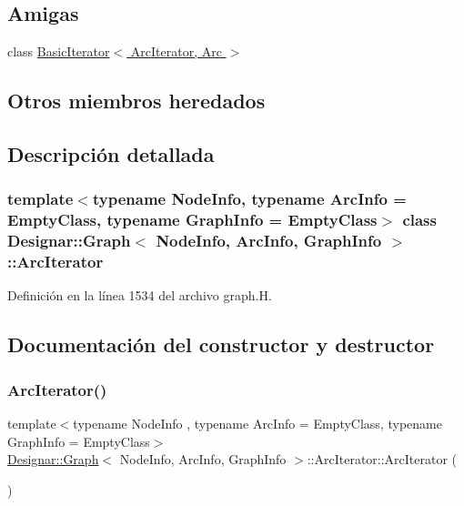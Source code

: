 \subsection*{Amigas}
\begin{DoxyCompactItemize}
\item 
class \hyperlink{class_designar_1_1_graph_1_1_arc_iterator_a530ad7c7218fa9b74a5cce004d0e3a1c}{Basic\+Iterator$<$ Arc\+Iterator, Arc $>$}
\end{DoxyCompactItemize}
\subsection*{Otros miembros heredados}


\subsection{Descripción detallada}
\subsubsection*{template$<$typename Node\+Info, typename Arc\+Info = Empty\+Class, typename Graph\+Info = Empty\+Class$>$\newline
class Designar\+::\+Graph$<$ Node\+Info, Arc\+Info, Graph\+Info $>$\+::\+Arc\+Iterator}



Definición en la línea 1534 del archivo graph.\+H.



\subsection{Documentación del constructor y destructor}
\mbox{\label{class_designar_1_1_graph_1_1_arc_iterator_a642cf08854577ea29ba520ee882c9d54}} 
\subsubsection{\texorpdfstring{Arc\+Iterator()}{ArcIterator()}\hspace{0.1cm}{\footnotesize\ttfamily [1/5]}}
{\footnotesize\ttfamily template$<$typename Node\+Info , typename Arc\+Info  = Empty\+Class, typename Graph\+Info  = Empty\+Class$>$ \\
\hyperlink{class_designar_1_1_graph}{Designar\+::\+Graph}$<$ Node\+Info, Arc\+Info, Graph\+Info $>$\+::Arc\+Iterator\+::\+Arc\+Iterator (\begin{DoxyParamCaption}{ }\end{DoxyParamCaption})\hspace{0.3cm}{\ttfamily [inline]}}



